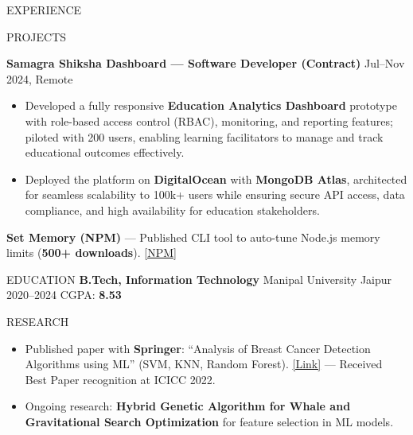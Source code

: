 \documentclass[10pt]{resume}
\begin{document}
\begin{rSection}{EXPERIENCE}
\begin{rSection}{PROJECTS}

\textbf{Samagra Shiksha Dashboard — Software Developer (Contract)} \hfill Jul–Nov 2024, Remote
\begin{itemize}
    \item Developed a fully responsive \textbf{Education Analytics Dashboard} prototype with role-based access control (RBAC), monitoring, and reporting features; piloted with 200 users, enabling learning facilitators to manage and track educational outcomes effectively.
    \item Deployed the platform on \textbf{DigitalOcean} with \textbf{MongoDB Atlas}, architected for seamless scalability to 100k+ users while ensuring secure API access, data compliance, and high availability for education stakeholders.
\end{itemize}

\textbf{Set Memory (NPM)} — Published CLI tool to auto-tune Node.js memory limits (\textbf{500+ downloads}).  
\href{https://www.npmjs.com/package/set-memory}{[NPM]}

\end{rSection}

\begin{rSection}{EDUCATION}
\textbf{B.Tech, Information Technology} \hfill Manipal University Jaipur \\
2020–2024 \quad CGPA: \textbf{8.53}
\end{rSection}

\begin{rSection}{RESEARCH}
\begin{itemize}
  \item Published paper with \textbf{Springer}: “Analysis of Breast Cancer Detection Algorithms using ML” (SVM, KNN, Random Forest).  
  \href{https://link.springer.com/chapter/10.1007/978-981-19-4990-6_57}{[Link]} — Received Best Paper recognition at ICICC 2022.
  \item Ongoing research: \textbf{Hybrid Genetic Algorithm for Whale and Gravitational Search Optimization} for feature selection in ML models.
\end{itemize}
\end{rSection}


\end{rSection}
\end{document}
